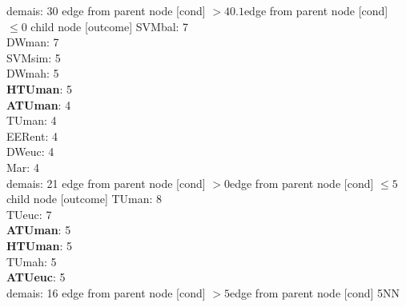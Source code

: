 {{{{{%
demais: 30} edge from parent node [cond] {$>40.1$}}edge from parent node [cond] {$\leq0$}}
child {node [outcome] {
SVMbal: 7\\
DWman: 7\\
SVMsim: 5\\
DWmah: 5\\
\textbf{HTUman}: 5\\
\textbf{ATUman}: 4\\
TUman: 4\\
EERent: 4\\
DWeuc: 4\\
Mar: 4\\
demais: 21} edge from parent node [cond] {$>0$}}edge from parent node [cond] {$\leq5$}}
child {node [outcome] {
TUman: 8\\
TUeuc: 7\\
\textbf{ATUman}: 5\\
\textbf{HTUman}: 5\\
TUmah: 5\\
\textbf{ATUeuc}: 5\\
demais: 16} edge from parent node [cond] {$>5$}}edge from parent node [cond] {5NN}}
